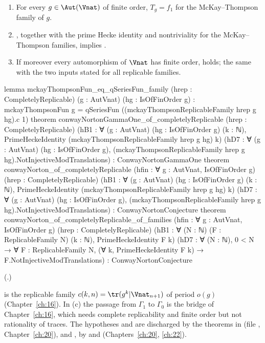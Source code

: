 \begin{theorem}\label{ch19:thm:cnconsequence}
\begin{enumerate}[label=(\alph*)]
\item For every $g\in\Aut(\Vnat)$ of finite order, $T_g=f_1$ for the McKay--Thompson family of $g$.
\item {}, together with the prime Hecke identity and nontriviality for the McKay--Thompson families, implies
  .
\item If moreover every automorphism of $\Vnat$ has finite order,  holds; the same with the two inputs
  stated for all replicable families.
\end{enumerate}
\end{theorem}
\begin{leancode}
lemma mckayThompsonFun_eq_qSeriesFun_family (hrep : CompletelyReplicable) (g : AutVnat)
    (hg : IsOfFinOrder g) :
    mckayThompsonFun g = qSeriesFun ((mckayThompsonReplicableFamily hrep g hg).c 1)
theorem conwayNortonGammaOne_of_completelyReplicable (hrep : CompletelyReplicable)
    (hB1 : ∀ (g : AutVnat) (hg : IsOfFinOrder g) (k : ℕ),
      PrimeHeckeIdentity (mckayThompsonReplicableFamily hrep g hg) k)
    (hD7 : ∀ (g : AutVnat) (hg : IsOfFinOrder g),
      (mckayThompsonReplicableFamily hrep g hg).NotInjectiveModTranslations) :
    ConwayNortonGammaOne
theorem conwayNorton_of_completelyReplicable (hfin : ∀ g : AutVnat, IsOfFinOrder g)
    (hrep : CompletelyReplicable)
    (hB1 : ∀ (g : AutVnat) (hg : IsOfFinOrder g) (k : ℕ),
      PrimeHeckeIdentity (mckayThompsonReplicableFamily hrep g hg) k)
    (hD7 : ∀ (g : AutVnat) (hg : IsOfFinOrder g),
      (mckayThompsonReplicableFamily hrep g hg).NotInjectiveModTranslations) :
    ConwayNortonConjecture
theorem conwayNorton_of_completelyReplicable_of_families (hfin : ∀ g : AutVnat, IsOfFinOrder g)
    (hrep : CompletelyReplicable)
    (hB1 : ∀ (N : ℕ) (F : ReplicableFamily N) (k : ℕ), PrimeHeckeIdentity F k)
    (hD7 : ∀ (N : ℕ), 0 < N → ∀ F : ReplicableFamily N, (∀ k, PrimeHeckeIdentity F k) →
      F.NotInjectiveModTranslations) :
    ConwayNortonConjecture
\end{leancode}
(.)
\begin{dictionary}
 is the replicable family $c(k,n)=\tr(g^k|\Vnat_{n+1})$ of period $o(g)$ (Chapter~\ref{ch:16}).
In (c) the passage from $\Gamma_1$ to $\Gamma_0$ is the bridge  of Chapter~\ref{ch:16}, which needs complete
replicability and finite order but not rationality of traces.  The hypotheses  and  are discharged by the theorems in
 (file , Chapter~\ref{ch:20}),
and ,  by  and  (Chapters~\ref{ch:20}, \ref{ch:22}).
\end{dictionary}
